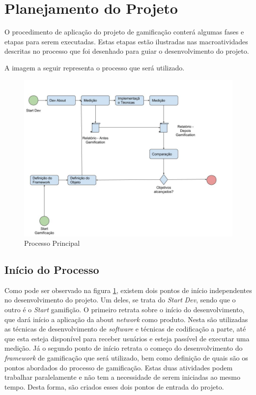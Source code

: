 \section{Planejamento do Projeto}
\label{sub:planejamento_do_projeto}
O procedimento de aplicação do projeto de gamificação conterá algumas fases
e etapas para serem executadas. Estas etapas estão ilustradas nas macroatividades 
descritas no processo que foi desenhado para guiar o desenvolvimento
do projeto.

A imagem a seguir representa o processo que será utilizado.

\begin{figure}[h]
    \centering
    \includegraphics[width=450px, scale=1]{figuras/mainprocess}
    \caption{Processo Principal}
    \label{fig:mainprocess}
\end{figure}

\subsection{Início do Processo}
\label{sub:initialprocess}
Como pode ser observado na figura \ref{fig:mainprocess}, existem dois pontos
de início independentes no desenvolvimento do projeto. Um deles, se trata do
\textit{Start} \textit{Dev}, sendo que o outro é o \textit{Start} gamifição. O primeiro retrata sobre
o início do desenvolvimento, que dará início a aplicação da about \textit{network}
como produto. Nesta são utilizadas as técnicas de desenvolvimento de \textit{software}
e técnicas de codificação a parte, até que esta esteja disponível para receber
usuários e esteja passível de executar uma medição. Já o segundo ponto de início
retrata o começo do desenvolvimento do \textit{framework} de gamificação que será utilizado,
bem como definição de quais são os pontos abordados do processo de gamificação.
Estas duas atividades podem trabalhar paralelamente e não tem a necessidade de
serem iniciadas ao mesmo tempo. Desta forma, são criados esses dois pontos de
entrada do projeto.

